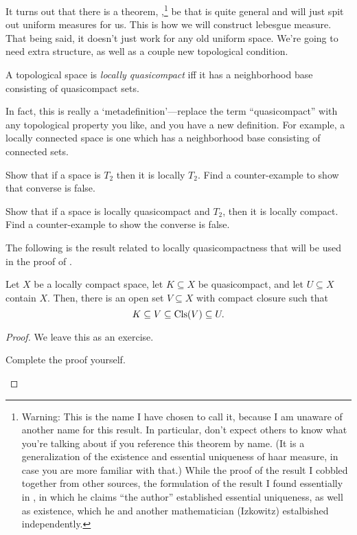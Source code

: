 It turns out that there is a theorem, ,\footnote{Warning:  This is the name I have chosen to call it, because I am unaware of another name for this result.  In particular, don't expect others to know what you're talking about if you reference this theorem by name.  (It is a generalization of the existence and essential uniqueness of haar measure, in case you are more familiar with that.)  While the proof of the result I cobbled together from other sources, the formulation of the result I found essentially in \cite{Howes}, in which he claims ``the author'' established essential uniqueness, as well as existence, which he and another mathematician (Izkowitz) estalbished independently.}  be that is quite general and will just spit out uniform measures for us.  This is how we will construct lebesgue measure.  That being said, it doesn't just work for any old uniform space.  We're going to need extra structure, as well as a couple new topological condition.
\begin{dfn}\label{LocallyQuasicompact}
A topological space is \emph{locally quasicompact} iff it has a neighborhood base consisting of quasicompact sets.
\begin{rmk}
In fact, this is really a `metadefinition'---replace the term ``quasicompact'' with any topological property you like, and you have a new definition.  For example, a locally connected space is one which has a neighborhood base consisting of connected sets.
\end{rmk}
\end{dfn}
\begin{exr}
Show that if a space is $T_2$ then it is locally $T_2$.  Find a counter-example to show that converse is false.
\end{exr}
\begin{exr}
Show that if a space is locally quasicompact and $T_2$, then it is locally compact.  Find a counter-example to show the converse is false.
\end{exr}
The following is the result related to locally quasicompactness that will be used in the proof of .
\begin{prp}\label{prp5.2.4}
Let $X$ be a locally compact space, let $K\subseteq X$ be quasicompact, and let $U\subseteq X$ contain $X$.  Then, there is an open set $V\subseteq X$ with compact closure such that
\begin{equation}
K\subseteq V\subseteq \operatorname{Cls} (V)\subseteq U.
\end{equation}
\begin{proof}
We leave this as an exercise.
\begin{exr}
Complete the proof yourself.
\end{exr}
\end{proof}
\end{prp}
